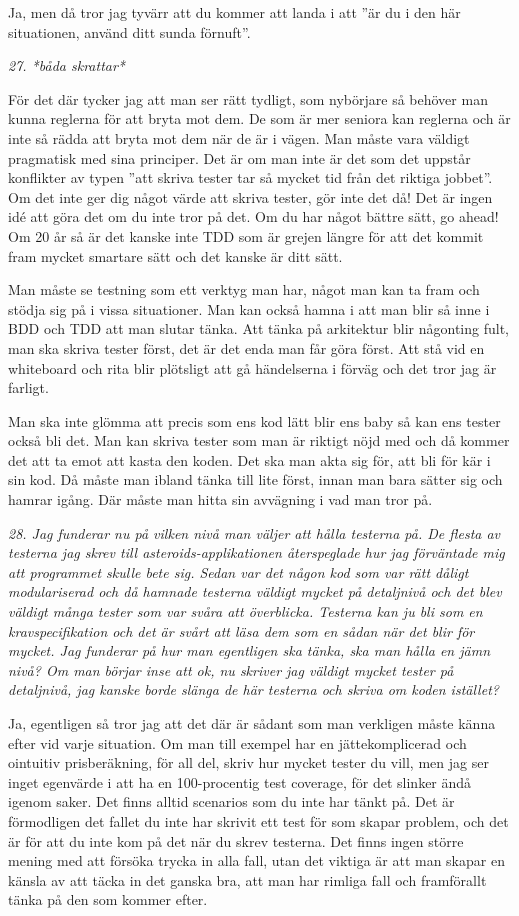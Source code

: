 \documentclass[11pt]{article}
\begin{document}
Ja, men då tror jag tyvärr att du kommer att landa i att ”är du i den här situationen, använd ditt sunda förnuft”.

\emph{27. *båda skrattar*}

För det där tycker jag att man ser rätt tydligt, som nybörjare så behöver man kunna reglerna för att bryta mot dem. De som är mer seniora kan reglerna och är inte så rädda att bryta mot dem när de är i vägen. Man måste vara väldigt pragmatisk med sina principer. Det är om man inte är det som det uppstår konflikter av typen ”att skriva tester tar så mycket tid från det riktiga jobbet”. Om det inte ger dig något värde att skriva tester, gör inte det då! Det är ingen idé att göra det om du inte tror på det. Om du har något bättre sätt, go ahead! Om 20 år så är det kanske inte TDD som är grejen längre för att det kommit fram mycket smartare sätt och det kanske är ditt sätt.

Man måste se testning som ett verktyg man har, något man kan ta fram och stödja sig på i vissa situationer. Man kan också hamna i att man blir så inne i BDD och TDD att man slutar tänka. Att tänka på arkitektur blir någonting fult, man ska skriva tester först, det är det enda man får göra först. Att stå vid en whiteboard och rita blir plötsligt att gå händelserna i förväg och det tror jag är farligt.

Man ska inte glömma att precis som ens kod lätt blir ens baby så kan ens tester också bli det. Man kan skriva tester som man är riktigt nöjd med och då kommer det att ta emot att kasta den koden. Det ska man akta sig för, att bli för kär i sin kod. Då måste man ibland tänka till lite först, innan man bara sätter sig och hamrar igång. Där måste man hitta sin avvägning i vad man tror på.

\emph{28. Jag funderar nu på vilken nivå man väljer att hålla testerna på. De flesta av testerna jag skrev till asteroids-applikationen återspeglade hur jag förväntade mig att programmet skulle bete sig. Sedan var det någon kod som var rätt dåligt modulariserad och då hamnade testerna väldigt mycket på detaljnivå och det blev väldigt många tester som var svåra att överblicka. Testerna kan ju bli som en kravspecifikation och det är svårt att läsa dem som en sådan när det blir för mycket. Jag funderar på hur man egentligen ska tänka, ska man hålla en jämn nivå? Om man börjar inse att ok, nu skriver jag väldigt mycket tester på detaljnivå, jag kanske borde slänga de här testerna och skriva om koden istället?}

Ja, egentligen så tror jag att det där är sådant som man verkligen måste känna efter vid varje situation. Om man till exempel har en jättekomplicerad och ointuitiv prisberäkning, för all del, skriv hur mycket tester du vill, men jag ser inget egenvärde i att ha en 100-procentig test coverage, för det slinker ändå igenom saker. Det finns alltid scenarios som du inte har tänkt på. Det är förmodligen det fallet du inte har skrivit ett test för som skapar problem, och det är för att du inte kom på det när du skrev testerna. Det finns ingen större mening med att försöka trycka in alla fall, utan det viktiga är att man skapar en känsla av att täcka in det ganska bra, att man har rimliga fall och framförallt tänka på den som kommer efter.
\end{document}
